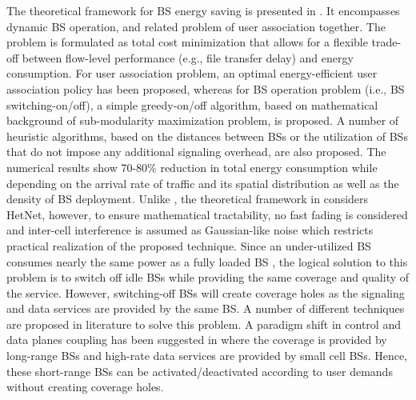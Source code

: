 \documentclass[article,10pt,twocolumn]{IEEEtran}
\begin{document}
The theoretical framework for BS energy saving is presented in \citep{5992823}. It encompasses dynamic BS operation, and related problem of user association together. The problem is formulated as total cost minimization that allows for a flexible trade-off between flow-level performance (e.g., file transfer delay) and energy consumption. For user association problem, an optimal energy-efficient user association policy has been proposed, whereas for BS operation problem (i.e., BS switching-on/off), a simple greedy-on/off algorithm, based on mathematical background of sub-modularity maximization problem, is proposed. A number of heuristic algorithms, based on the distances between BSs or the utilization of BSs that do not impose any additional signaling overhead, are also proposed. The numerical results show 70-80\% reduction in total energy consumption while depending on the arrival rate of traffic and its spatial distribution as well as the density of BS deployment. Unlike \citep{6489498}, the theoretical framework in \citep{5992823} considers HetNet, however, to ensure mathematical tractability, no fast fading is considered and inter-cell interference is assumed as Gaussian-like noise which restricts practical realization of the proposed technique.
Since an under-utilized BS consumes nearly the same power as a fully loaded BS \citep{6056691}, the logical solution to this problem is to switch off idle BSs while providing the same coverage and quality of the service. However, switching-off BSs will create coverage holes as the signaling and data services are provided by the same BS. A number of different techniques are proposed in literature to solve this problem. A paradigm shift in control and data planes coupling has been suggested in \citep{6152217} where the coverage is provided by long-range BSs and high-rate data services are provided by small cell BSs. Hence, these short-range BSs can be activated/deactivated according to user demands without creating coverage holes.
\end{document}
